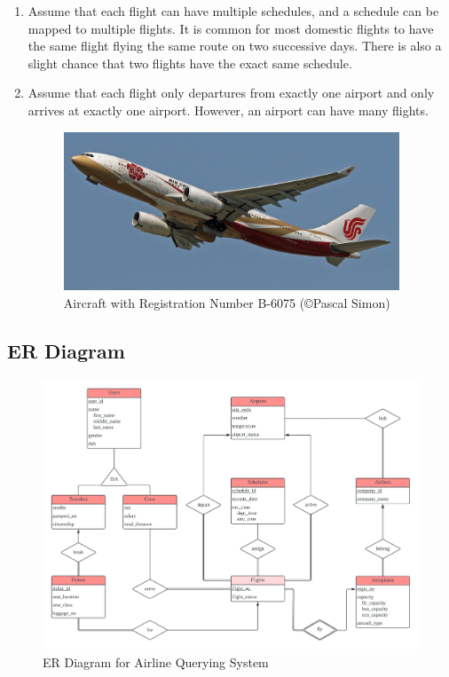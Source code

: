 \documentclass{article}
\begin{document}
\begin{enumerate}
		\item Assume that each flight can have multiple schedules, and a schedule can be mapped to multiple flights. It is common for most domestic flights to have the same flight flying the same route on two successive days. There is also a slight chance that two flights have the exact same schedule.
		
		\item Assume that each flight only departures from exactly one airport and only arrives at exactly one airport. However, an airport can have many flights.
		
		\begin{figure}[H]
			\centering
			\includegraphics[width=100mm]{CSDS341_Project_B-6075.jpg}
			\caption{Aircraft with Registration Number B-6075 (\copyright Pascal Simon)}
		\end{figure}
		
	\end{enumerate}
	
	\subsection{ER Diagram}
	
	\begin{figure}[H]
		\centering
		\includegraphics[width=140mm]{CSDS341_Project_ER_Diagram.jpeg}
		\caption{ER Diagram for Airline Querying System}
	\end{figure}
	
\end{document}
